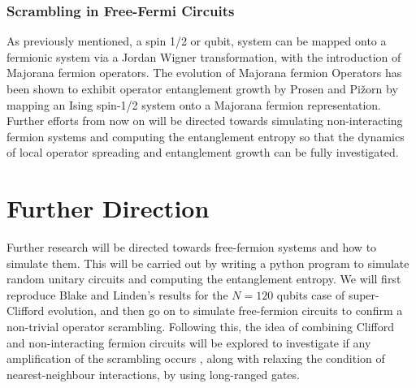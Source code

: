 \subsubsection{Scrambling in Free-Fermi Circuits}
As previously mentioned, a spin 1/2 or qubit, system can be mapped onto a fermionic system via a Jordan Wigner
transformation, with the introduction of Majorana fermion operators. The evolution of Majorana fermion Operators
has been shown to exhibit operator entanglement growth by Prosen and Pi\v{z}orn \cite{Prosen_2007} by mapping an Ising spin-1/2
system onto a Majorana fermion representation. Further efforts from now on will be directed towards simulating
non-interacting fermion systems and computing the entanglement entropy so that the dynamics of local operator spreading
and entanglement growth can be fully investigated.

\section{Further Direction}
Further research will be directed towards free-fermion systems and how to simulate them. This will be carried out
by writing a python program to simulate random unitary circuits and computing the entanglement entropy. We will first
reproduce Blake and Linden's results for the $N = 120$ qubits case of super-Clifford evolution, and then go on to
simulate free-fermion circuits to confirm a non-trivial operator scrambling. Following this, the idea of combining
Clifford and non-interacting fermion circuits will be explored to investigate if any amplification of the
scrambling occurs \cite{Jozsa2008}, along with relaxing the condition of nearest-neighbour interactions, by using
long-ranged gates.



